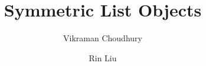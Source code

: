 \documentclass[a4paper,UKenglish,cleveref]{lipics-v2021}
\title{Symmetric List Objects}
\author%
{Vikraman Choudhury}%
{University of Strathclyde, Glasgow, United Kingdom}%
{vikraman.choudhury@strath.ac.uk}%
{https://orcid.org/0000-0003-2030-8056}%
{}
\author%
{Rin Liu}%
{University of Strathclyde, Glasgow, United Kingdom}%
{rin.liu@strath.ac.uk}%
{https://orcid.org/0009-0005-8791-2495}%
{}
\begin{document}
\maketitle

\begin{abstract}
  
\end{abstract}



\renewcommand{\appendixsectionformat}[2]{
  {Supplementary material for Section~#1 (#2)}
}


\appendix
\end{document}
